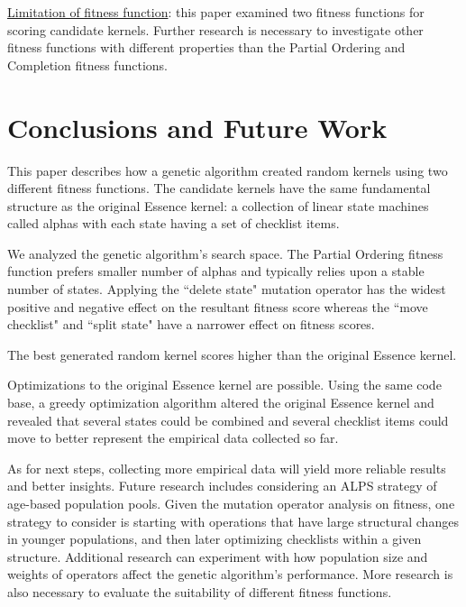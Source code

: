 \documentclass[3p,times,procedia]{elsarticle}
\begin{document}
\underline{Limitation of fitness function}: this paper examined two  fitness functions for scoring candidate kernels. Further research is necessary to investigate other fitness functions with different properties than the Partial Ordering and Completion fitness functions.

\section{Conclusions and Future Work}

This paper describes how a genetic algorithm created random kernels using two different fitness functions. The candidate kernels have the same fundamental structure as the original Essence kernel: a collection of linear state machines called alphas with each state having a set of checklist items. 

We analyzed the genetic algorithm's search space. The Partial Ordering fitness function prefers smaller number of alphas and typically relies upon a stable number of states. Applying the ``delete state" mutation operator has the widest positive and negative effect on the resultant fitness score whereas the ``move checklist" and ``split state" have a narrower effect on fitness scores. 


The best generated random kernel scores higher than the original Essence kernel. 

Optimizations to the original Essence kernel are possible. Using the same code base, a greedy optimization algorithm altered the original Essence kernel and revealed that several states could be combined and several checklist items could move to better represent the empirical data collected so far.

As for next steps, collecting more empirical data will yield more reliable results and better insights. Future research includes considering an ALPS strategy \cite{ALPS} of age-based population pools. 
Given the mutation operator analysis on fitness, one strategy to consider is starting with operations that have large structural changes in younger populations, and then later optimizing checklists within a given structure. Additional research can experiment with how population size and weights of operators affect the genetic algorithm's performance. More research is also necessary to evaluate the suitability of different fitness functions. %
\end{document}
